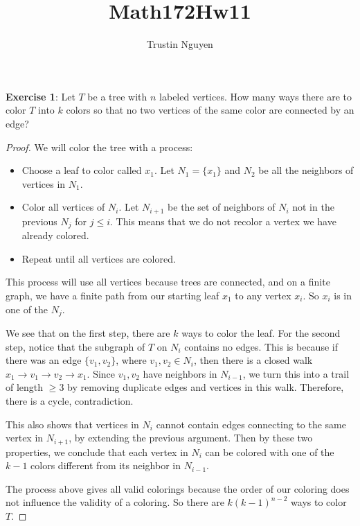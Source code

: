 \documentclass{article}
\title{Math172Hw11}
\author{Trustin Nguyen}
\begin{document}
    \maketitle

\reversemarginpar

\textbf{Exercise 1}: Let $T$ be a tree with $n$ labeled vertices. How many ways there are to color $T$ into $k$ colors so that no two vertices of the same color are connected by an edge?
    \begin{proof}
        We will color the tree with a process:
            \begin{itemize}
                \item Choose a leaf to color called $x_{1}$. Let $N_{1} = \{x_{1}\}$ and $N_{2}$ be all the neighbors of vertices in $N_{1}$.

                \item Color all vertices of $N_{i}$. Let $N_{i + 1}$ be the set of neighbors of $N_{i}$ not in the previous $N_{j}$ for $j \leq i$. This means that we do not recolor a vertex we have already colored.

                \item Repeat until all vertices are colored.
            \end{itemize}
        This process will use all vertices because trees are connected, and on a finite graph, we have a finite path from our starting leaf $x_{1}$ to any vertex $x_{i}$. So $x_{i}$ is in one of the $N_{j}$.

        We see that on the first step, there are $k$ ways to color the leaf. For the second step, notice that the subgraph of $T$ on $N_{i}$ contains no edges. This is because if there was an edge $\{v_{1}, v_{2}\}$, where $v_{1}, v_{2}  \in N_{i}$, then there is a closed walk $x_{1} \rightarrow v_{1} \rightarrow v_{2} \rightarrow x_{1}$. Since $v_{1}, v_{2}$ have neighbors in $N_{i - 1}$, we turn this into a trail of length $\geq 3$ by removing duplicate edges and vertices in this walk. Therefore, there is a cycle, contradiction.

        This also shows that vertices in $N_{i}$ cannot contain edges connecting to the same vertex in $N_{i + 1}$, by extending the previous argument. Then by these two properties, we conclude that each vertex in $N_{i}$ can be colored with one of the $k - 1$ colors different from its neighbor in $N_{i - 1}$. 

        The process above gives all valid colorings because the order of our coloring does not influence the validity of a coloring. So there are $k(k - 1)^{n - 2}$ ways to color $T$.
    \end{proof}
\end{document}
